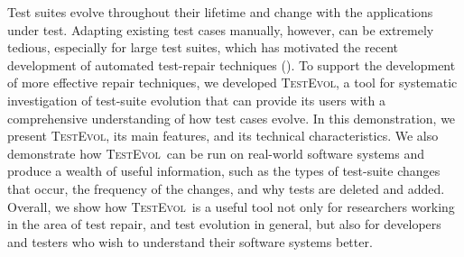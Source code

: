 \documentclass[conference]{IEEEtran}
\newcommand{\tool}{\textsc{TestEvol}\xspace}
\begin{document}
Test suites evolve throughout their lifetime and change with the
applications under test. Adapting existing test cases manually,
however, can be extremely tedious, especially for large test suites,
which has motivated the recent development of automated test-repair
techniques (\eg \cite{Daniel:2009, Daniel:2010, Mirzaaghaei:2012}).
To support the development of more effective repair techniques, we
developed \tool, a tool for systematic investigation of test-suite
evolution that can provide its users with a comprehensive
understanding of how test cases evolve. In this demonstration, we
present \tool, its main features, and its technical
characteristics. We also demonstrate how \tool\ can be run on
real-world software systems and produce a wealth of useful
information, such as the types of test-suite changes that occur, the
frequency of the changes, and why tests are deleted and added.
Overall, we show how \tool\ is a useful tool not only for researchers
working in the area of test repair, and test evolution in general, but
also for developers and testers who wish to understand their software
systems better.




{\footnotesize

}
\end{document}
